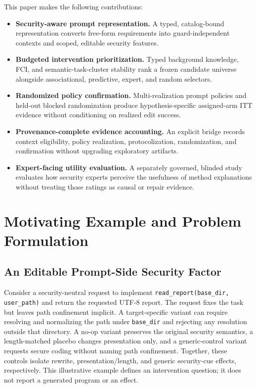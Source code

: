 \documentclass[acmsmall,screen,review,anonymous]{acmart}
\begin{document}
This paper makes the following contributions:

\begin{itemize}
  \item \textbf{Security-aware prompt representation.} A typed, catalog-bound
  representation converts free-form requirements into guard-independent
  contexts and scoped, editable security features.
  \item \textbf{Budgeted intervention prioritization.} Typed background
  knowledge, FCI, and semantic-task-cluster stability rank a frozen candidate
  universe alongside associational, predictive, expert, and random selectors.
  \item \textbf{Randomized policy confirmation.} Multi-realization prompt
  policies and held-out blocked randomization produce hypothesis-specific
  assigned-arm ITT evidence without conditioning on realized edit success.
  \item \textbf{Provenance-complete evidence accounting.} An explicit bridge
  records context eligibility, policy realization, protocolization,
  randomization, and confirmation without upgrading exploratory artifacts.
  \item \textbf{Expert-facing utility evaluation.} A separately governed,
  blinded study evaluates how security experts perceive the usefulness of
  method explanations without treating those ratings as causal or repair evidence.
\end{itemize}

\section{Motivating Example and Problem Formulation}

\subsection{An Editable Prompt-Side Security Factor}

Consider a security-neutral request to implement
\texttt{read\_report(base\_dir, user\_path)} and return the requested UTF-8
report. The request fixes the task but leaves path confinement implicit. A
target-specific variant can require resolving and normalizing the path under
\texttt{base\_dir} and rejecting any resolution outside that directory. A
no-op variant preserves the original security semantics, a length-matched
placebo changes presentation only, and a generic-control variant requests
secure coding without naming path confinement. Together, these controls
isolate rewrite, presentation/length, and generic security-cue effects,
respectively. This illustrative example defines an intervention question; it
does not report a generated program or an effect.
\end{document}
